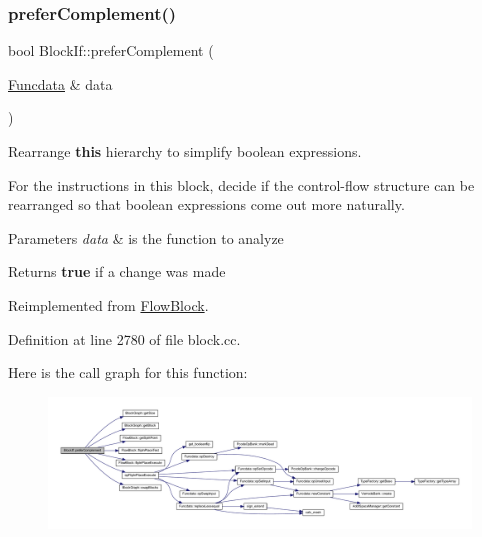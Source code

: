 \subsubsection{\texorpdfstring{preferComplement()}{preferComplement()}}
{\footnotesize\ttfamily bool Block\+If\+::prefer\+Complement (\begin{DoxyParamCaption}\item[{\mbox{\hyperlink{class_funcdata}{Funcdata}} \&}]{data }\end{DoxyParamCaption})\hspace{0.3cm}{\ttfamily [virtual]}}



Rearrange {\bfseries{this}} hierarchy to simplify boolean expressions. 

For the instructions in this block, decide if the control-\/flow structure can be rearranged so that boolean expressions come out more naturally. 
\begin{DoxyParams}{Parameters}
{\em data} & is the function to analyze \\
\hline
\end{DoxyParams}
\begin{DoxyReturn}{Returns}
{\bfseries{true}} if a change was made 
\end{DoxyReturn}


Reimplemented from \mbox{\hyperlink{class_flow_block_a6ab46f9a87bc94b30bd3bee0923b3f51}{Flow\+Block}}.



Definition at line 2780 of file block.\+cc.

Here is the call graph for this function\+:
\nopagebreak
\begin{figure}[H]
\begin{center}
\leavevmode
\includegraphics[width=350pt]{class_block_if_a41fef7fb5278f859257b6e560c0a08dd_cgraph}
\end{center}
\end{figure}
\mbox{\label{class_block_if_a6c45f688f991ec5f1412c51e56bf5fd3}} 

